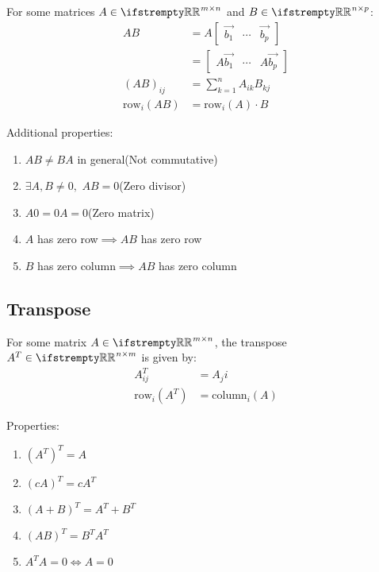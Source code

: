 \documentclass[12pt, a4paper]{article}
\begin{document}
\begin{multicols*}{3}
For some matrices $A \in \RR^{m{\times}n}$ and $B \in \RR^{n{\times}p}$:
\begin{align*}
  AB &= A\begin{bmatrix}\vec{b_1} & \cdots & \vec{b_p}\end{bmatrix} \\
                                 &= \begin{bmatrix}A\vec{b_1} & \cdots & A\vec{b_p}\end{bmatrix} \\ 
  (AB)_{ij} &= \sum^n_{k=1}A_{ik}B_{kj} \\
  \text{row}_i(AB) &= \text{row}_i(A){\cdot}B
\end{align*}

Additional properties:
\begin{enumerate}[\roman*.]
  \item $AB \neq BA$ in general\hfill(Not commutative)
  \item $\exists A,B\neq 0,$ $AB = 0$\hfill(Zero divisor)
  \item $A0 = 0A = 0$\hfill(Zero matrix)
  \item $A$ has zero row$\implies AB$ has zero row
  \item $B$ has zero column$\implies AB$ has zero column
\end{enumerate}

\subsection{Transpose}
For some matrix $A \in \RR^{m{\times}n}$, the transpose $A^T \in \RR^{n{\times}m}$ is given by:
\begin{align*}
  A^T_{ij} &= A_ji \\
  \text{row}_i(A^T) &= \text{column}_i(A)
\end{align*}

Properties:
\begin{enumerate}[\roman*.]
  \item $(A^T)^T = A$
  \item $(cA)^T = cA^T$
  \item $(A + B)^T = A^T + B^T$
  \item $(AB)^T = B^TA^T$
  \item $A^TA = 0 \iff A = 0$
\end{enumerate}

\colbreak

\end{multicols*}
\end{document}
